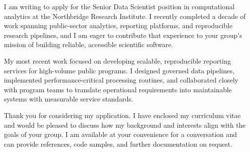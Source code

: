 \documentclass{careerdossier-letter}
\begin{document}
\MakeCDossierLetterhead

I am writing to apply for the Senior Data Scientist position in computational
analytics at the Northbridge Research Institute. I recently completed a decade
of work spanning public-sector analytics, reporting platforms, and reproducible
research pipelines, and I am eager to contribute that experience to your group's
mission of building reliable, accessible scientific software.

My most recent work focused on developing scalable, reproducible reporting
services for high-volume public programs. I designed governed data pipelines,
implemented performance-critical processing routines, and collaborated closely
with program teams to translate operational requirements into maintainable
systems with measurable service standards.

\newpage

Thank you for considering my application. I have enclosed my curriculum vitae and
would be pleased to discuss how my background and interests align with the goals
of your group. I am available at your convenience for a conversation and can
provide references, code samples, and further documentation on request.

\MakeCDossierClosing
\end{document}
